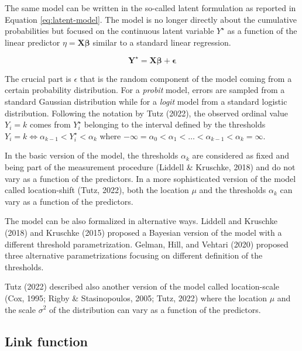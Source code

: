 \documentclass[
  man, mask,floatsintext]{apa6}
\begin{document}
\normalsize

The same model can be written in the so-called latent formulation as reported in Equation \eqref{eq:latent-model}. The model is no longer directly about the cumulative probabilities but focused on the continuous latent variable \(Y^\star\) as a function of the linear predictor \(\eta = \mathbf{X} \boldsymbol{\beta}\) similar to a standard linear regression.

\begin{equation}
\mathbf{Y^\star} = \mathbf{X}\boldsymbol{\beta} + \mathbf{\epsilon}
\label{eq:latent-model}
\end{equation}

The crucial part is \(\epsilon\) that is the random component of the model coming from a certain probability distribution. For a \emph{probit} model, errors are sampled from a standard Gaussian distribution while for a \emph{logit} model from a standard logistic distribution. Following the notation by Tutz (2022), the observed ordinal value \(Y_i = k\) comes from \(Y^\star_i\) belonging to the interval defined by the thresholds \(Y_i = k \iff \alpha_{k - 1} < Y^\star_i < \alpha_{k}\) where \(- \infty = \alpha_0 < \alpha_1 < \dots< \alpha_{k - 1} < \alpha_k = \infty\).

In the basic version of the model, the thresholds \(\alpha_k\) are considered as fixed and being part of the measurement procedure (Liddell \& Kruschke, 2018) and do not vary as a function of the predictors. In a more sophisticated version of the model called location-shift (Tutz, 2022), both the location \(\mu\) and the thresholds \(\alpha_k\) can vary as a function of the predictors.

The model can be also formalized in alternative ways. Liddell and Kruschke (2018) and Kruschke (2015) proposed a Bayesian version of the model with a different threshold parametrization. Gelman, Hill, and Vehtari (2020) proposed three alternative parametrizations focusing on different definition of the thresholds.

Tutz (2022) described also another version of the model called location-scale (Cox, 1995; Rigby \& Stasinopoulos, 2005; Tutz, 2022) where the location \(\mu\) and the scale \(\sigma^2\) of the distribution can vary as a function of the predictors.

\subsection{Link function}\label{link-function}
\end{document}
